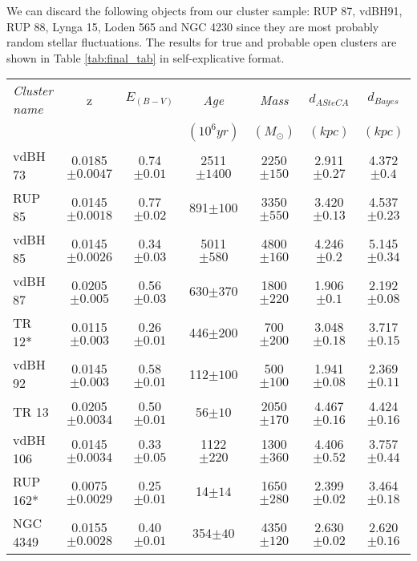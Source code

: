 \documentclass{aa}
\begin{document}
We can discard the following objects from our cluster sample: RUP 87,
vdBH91, RUP 88, Lynga 15, Loden 565 and NGC 4230 since they are most probably
random stellar fluctuations. The results for true and probable open clusters are
shown in Table \ref{tab:final_tab} in self-explicative format.\\

\begin{table*}[ht]
\centering
\begin{tabular}{lcccccc}
\hline
 \emph{Cluster name} & z & $E_{(B-V)}$ & \emph{Age} & \emph{Mass} &
 $d_{ASteCA}$ & $d_{Bayes}$
 \\
& & & $(10^6 yr)$ & $(M_{\odot})$ & $(kpc)$ & $(kpc)$\\
 \hline\hline
 vdBH 73 & 0.0185$\pm0.0047$ & 0.74$\pm0.01$ & 2511$\pm1400$ & 2250$\pm150$ &
 2.911$\pm0.27$ & 4.372$\pm0.4$\\
 RUP 85 & 0.0145$\pm0.0018$ & 0.77$\pm0.02$ & 891$\pm100$ & 3350$\pm550$ &
 3.420$\pm0.13$ & 4.537$\pm0.23$ \\
  vdBH 85 & 0.0145$\pm0.0026$ & 0.34$\pm0.03$ & 5011$\pm580$ & 4800$\pm160$ &
  4.246$\pm0.2$ & 5.145$\pm0.34$ \\
 vdBH 87 & 0.0205$\pm0.005$ & 0.56$\pm0.03$ & 630$\pm370$ & 1800$\pm220$ &
 1.906$\pm0.1$ & 2.192$\pm0.08$ \\
 TR 12* & 0.0115$\pm0.003$ & 0.26$\pm0.01$ & 446$\pm200$ & 700$\pm200$ &
 3.048$\pm0.18$ & 3.717$\pm0.15$ \\
 vdBH 92 & 0.0145$\pm0.003$ & 0.58$\pm0.01$ & 112$\pm100$ & 500$\pm100$ &
 1.941$\pm0.08$ & 2.369$\pm0.11$ \\
 TR 13 & 0.0205$\pm0.0034$ & 0.50$\pm0.01$ & 56$\pm10$ & 2050$\pm170$ &
 4.467$\pm0.16$ & 4.424$\pm0.16$ \\
 vdBH 106 & 0.0145$\pm0.0034$ & 0.33$\pm0.05$ & 1122$\pm220$ & 1300$\pm360$ &
 4.406$\pm0.52$ & 3.757$\pm0.44$ \\
 RUP 162* & 0.0075$\pm0.0029$ & 0.25$\pm0.01$ & 14$\pm14$ & 1650$\pm280$ &
 2.399$\pm0.02$ & 3.464$\pm0.18$ \\
 NGC 4349 & 0.0155$\pm0.0028$ & 0.40$\pm0.01$ & 354$\pm40$ & 4350$\pm120$ &
 2.630$\pm0.02$ & 2.620$\pm0.16$ \\
 \hline
\end{tabular}
\caption{The symbol ``*'' indicates probable clusters. The $d_{Bayes}$ values
are those obtained using the Bayesian method and the Lindegren et al. bias
correction on the parallax data. Uncertainties for the fundamental parameters are
shown in parenthesis.}
\label{tab:final_tab}
\end{table*}
\end{document}
